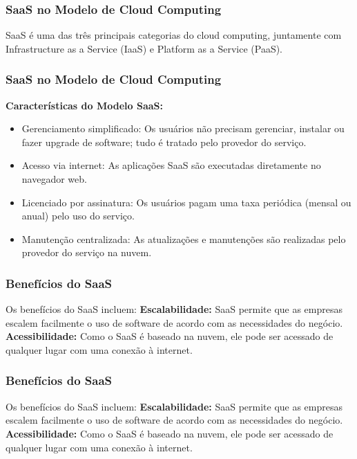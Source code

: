 \documentclass{beamer}
\begin{document}
\begin{frame}
	\frametitle{SaaS no Modelo de Cloud Computing}

	SaaS é uma das três principais categorias do cloud computing, juntamente com Infrastructure as a Service (IaaS) e Platform as a Service (PaaS).



\end{frame}
\begin{frame}
	\frametitle{SaaS no Modelo de Cloud Computing}

	\textbf{Características do Modelo SaaS:}
	\begin{itemize}
		\item Gerenciamento simplificado: Os usuários não precisam gerenciar, instalar ou fazer upgrade de software; tudo é tratado pelo provedor do serviço.
		\item Acesso via internet: As aplicações SaaS são executadas diretamente no navegador web.
		\item Licenciado por assinatura: Os usuários pagam uma taxa periódica (mensal ou anual) pelo uso do serviço.
		\item Manutenção centralizada: As atualizações e manutenções são realizadas pelo provedor do serviço na nuvem.
	\end{itemize}


\end{frame}

\begin{frame}
	\frametitle{Benefícios do SaaS}

	Os benefícios do SaaS incluem:
	\linebreak
	\linebreak
	\textbf{Escalabilidade:} SaaS permite que as empresas escalem facilmente o uso de software de acordo com as necessidades do negócio.
	\linebreak
	\linebreak
	\textbf{Acessibilidade:} Como o SaaS é baseado na nuvem, ele pode ser acessado de qualquer lugar com uma conexão à internet.


\end{frame}

\begin{frame}
	\frametitle{Benefícios do SaaS}

	Os benefícios do SaaS incluem:
	\linebreak
	\linebreak
	\textbf{Escalabilidade:} SaaS permite que as empresas escalem facilmente o uso de software de acordo com as necessidades do negócio.
	\linebreak
	\linebreak
	\textbf{Acessibilidade:} Como o SaaS é baseado na nuvem, ele pode ser acessado de qualquer lugar com uma conexão à internet.

\end{frame}
\end{document}
